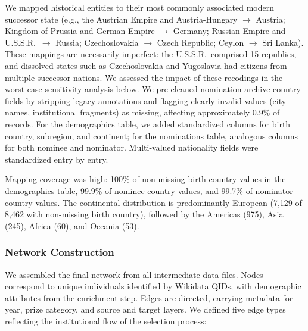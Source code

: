\documentclass[12pt]{article}
\begin{document}
We mapped historical entities to their most commonly associated modern successor state (e.g., the Austrian Empire and Austria-Hungary $\to$ Austria; Kingdom of Prussia and German Empire $\to$ Germany; Russian Empire and U.S.S.R.\ $\to$ Russia; Czechoslovakia $\to$ Czech Republic; Ceylon $\to$ Sri Lanka). These mappings are necessarily imperfect: the U.S.S.R.\ comprised 15 republics, and dissolved states such as Czechoslovakia and Yugoslavia had citizens from multiple successor nations. We assessed the impact of these recodings in the worst-case sensitivity analysis below. We pre-cleaned nomination archive country fields by stripping legacy annotations and flagging clearly invalid values (city names, institutional fragments) as missing, affecting approximately 0.9\% of records. For the demographics table, we added standardized columns for birth country, subregion, and continent; for the nominations table, analogous columns for both nominee and nominator. Multi-valued nationality fields were standardized entry by entry.

Mapping coverage was high: 100\% of non-missing birth country values in the demographics table, 99.9\% of nominee country values, and 99.7\% of nominator country values. The continental distribution is predominantly European (7,129 of 8,462 with non-missing birth country), followed by the Americas (975), Asia (245), Africa (60), and Oceania (53).

\subsubsection*{Network Construction}

We assembled the final network from all intermediate data files. Nodes correspond to unique individuals identified by Wikidata QIDs, with demographic attributes from the enrichment step. Edges are directed, carrying metadata for year, prize category, and source and target layers. We defined five edge types reflecting the institutional flow of the selection process:
\end{document}
